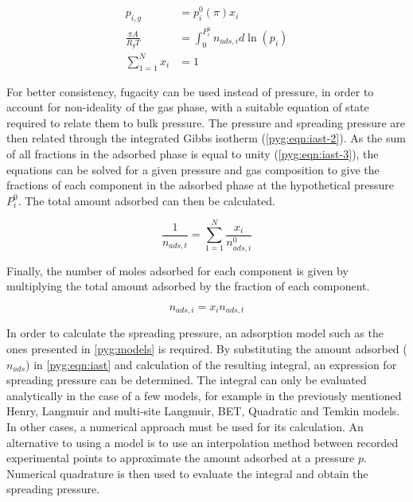 \begin{align}
	p_{i,g}             & = p_i^0(\pi)x_i                              %
	\label{pyg:eqn:iast}                                               \\
	\frac{\pi A}{R_g T} & = \int_{0}^{P_{i}^{0}} n_{ads,i} d\ln{(p_i)} %
	\label{pyg:eqn:iast-2}                                             \\
	\sum_{1=1}^{N} x_i  & = 1                                          %
	\label{pyg:eqn:iast-3}
\end{align}

For better consistency, fugacity can be used instead of pressure,
in order to account for non-ideality of the gas phase,
with a suitable equation of state required to relate them to bulk pressure.
The pressure and spreading pressure are then related through
the integrated Gibbs isotherm (\autoref{pyg:eqn:iast-2}). As the sum of all
fractions in the adsorbed phase is equal to unity (\autoref{pyg:eqn:iast-3}),
the equations can be solved for a given pressure and gas composition to give
the fractions of each component in the adsorbed phase at the hypothetical
pressure \(P_{i}^{0}\). The total amount adsorbed can then be calculated.

\begin{equation}
	\frac{1}{n_{ads,t}} = \sum_{1=1}^{N} \frac{x_i}{n_{ads,i}^0}
\end{equation}

Finally, the number of moles adsorbed for each component is given
by multiplying the total amount adsorbed by the fraction of each
component.

\begin{equation}
	n_{ads, i} = x_i n_{ads,t}
\end{equation}

In order to calculate the spreading pressure, an adsorption model
such as the ones presented in \autoref{pyg:models} is required.
By substituting the amount adsorbed (\(n_{ads}\)) in \autoref{pyg:eqn:iast}
and calculation of the resulting integral, an expression for
spreading pressure can be determined. The integral can only be
evaluated analytically in the case of a few models, for example in
the previously mentioned Henry, Langmuir and multi-site Langmuir,
BET, Quadratic and Temkin models. In other cases, a numerical approach
must be used for its calculation. An alternative to using a
model is to use an interpolation method between recorded experimental
points to approximate the amount adsorbed at a pressure \(p\). Numerical
quadrature is then used to evaluate the integral and obtain the
spreading pressure.
